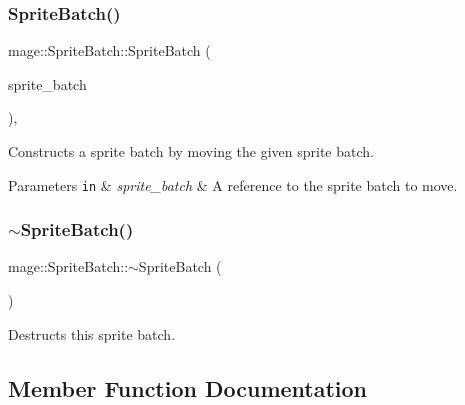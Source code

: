 \subsubsection{\texorpdfstring{Sprite\+Batch()}{SpriteBatch()}\hspace{0.1cm}{\footnotesize\ttfamily [4/4]}}
{\footnotesize\ttfamily mage\+::\+Sprite\+Batch\+::\+Sprite\+Batch (\begin{DoxyParamCaption}\item[{\hyperlink{classmage_1_1_sprite_batch}{Sprite\+Batch} \&\&}]{sprite\+\_\+batch }\end{DoxyParamCaption})\hspace{0.3cm}{\ttfamily [default]}, {\ttfamily [noexcept]}}

Constructs a sprite batch by moving the given sprite batch.


\begin{DoxyParams}[1]{Parameters}
\mbox{\tt in}  & {\em sprite\+\_\+batch} & A reference to the sprite batch to move. \\
\hline
\end{DoxyParams}
\hypertarget{classmage_1_1_sprite_batch_a1c284e2c0ed96081f9f2fb1f84e5817f}{}\label{classmage_1_1_sprite_batch_a1c284e2c0ed96081f9f2fb1f84e5817f} 
\subsubsection{\texorpdfstring{$\sim$\+Sprite\+Batch()}{~SpriteBatch()}}
{\footnotesize\ttfamily mage\+::\+Sprite\+Batch\+::$\sim$\+Sprite\+Batch (\begin{DoxyParamCaption}{ }\end{DoxyParamCaption})\hspace{0.3cm}{\ttfamily [default]}}

Destructs this sprite batch. 

\subsection{Member Function Documentation}
\hypertarget{classmage_1_1_sprite_batch_a0c86254b49fd51f90db1231ac08cd521}{}\label{classmage_1_1_sprite_batch_a0c86254b49fd51f90db1231ac08cd521} 
